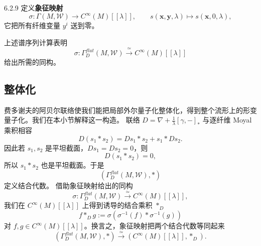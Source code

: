 \begin{definition}{6.2.9}
  定义\textbf{象征映射}
  \[
  \sigma:\Gamma(M,\mathcal{W})\longrightarrow C^\infty(M)[[\lambda]],
  \qquad
  s(\mathbf x,\mathbf y,\lambda)\mapsto s(\mathbf x,0,\lambda),
  \]
  它把所有纤维变量 $y^i$ 送到零。
\end{definition}

上述谱序列计算表明
\[
\sigma:\Gamma^{flat}_D(M,\mathcal{W})
\xrightarrow{\ \simeq\ }C^\infty(M)[[\lambda]]
\]
给出所需的同构。

\subsection{整体化}

费多谢夫的阿贝尔联络使我们能把局部外尔量子化整体化，得到整个流形上的形变量子化。我们在本小节解释这一构造。
联络 $D=\nabla+\frac1\lambda[\gamma,-]_*$ 与逐纤维 Moyal 乘积相容
\[
D(s_1*s_2)=Ds_1*s_2+s_1*Ds_2.
\]
因此若 $s_1,s_2$ 是平坦截面，$Ds_1=Ds_2=0$，则
\[
D(s_1*s_2)=0,
\]
所以 $s_1*s_2$ 也是平坦截面。于是
\[
(\Gamma^{flat}_D(M,\mathcal{W}),*)
\]
定义结合代数。
借助象征映射给出的同构
\[
\sigma:\Gamma^{flat}_D(M,\mathcal{W})
\xrightarrow{\ \simeq\ }C^\infty(M)[[\lambda]],
\]
我们在 $C^\infty(M)[[\lambda]]$ 上得到诱导的结合乘积 $*_D$
\[
f*_Dg:=\sigma\left(\sigma^{-1}(f)*\sigma^{-1}(g)\right)
\]
对 $f,g\in C^\infty(M)[[\lambda]]$。换言之，象征映射把两个结合代数等同起来
\[
(\Gamma^{flat}_D(M,\mathcal{W}),*)
\xrightarrow{\ \simeq\ }(C^\infty(M)[[\lambda]],*_D).
\]











